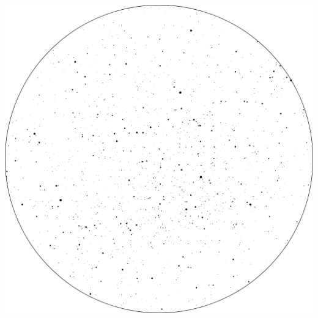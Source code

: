\documentclass{SAS-class-skygen}
\begin{document}
	\vspace{0.5cm}
    \begin{center}
    \includegraphics[width=\textwidth]{./pics/sky_chart7.png}
    \end{center}
    
    
\end{document}
